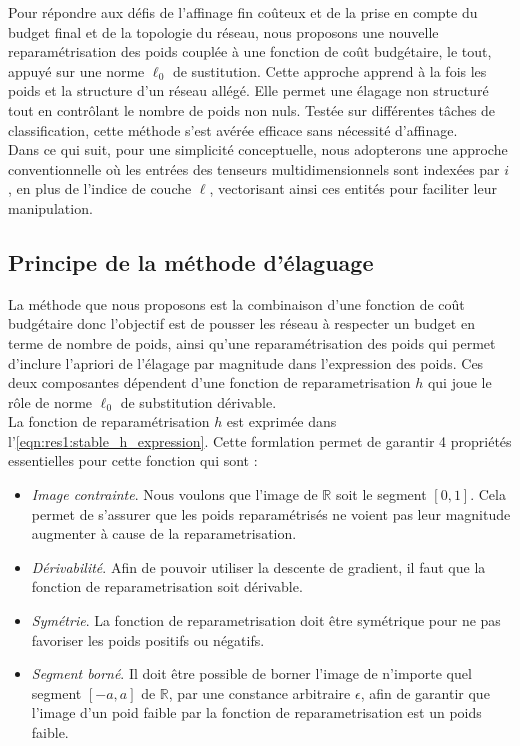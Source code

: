 Pour répondre aux défis de l'affinage fin coûteux et de la prise en compte du
budget final et de la topologie du réseau, nous proposons une nouvelle
reparamétrisation des poids couplée à une fonction de coût budgétaire, le tout,
appuyé sur une norme $\ell_0$ de sustitution. Cette approche apprend à la fois
les poids et la structure d'un réseau allégé. Elle permet une élagage non
structuré tout en contrôlant le nombre de poids non nuls. Testée sur différentes
tâches de classification, cette méthode s'est avérée efficace sans nécessité
d'affinage.\\

Dans ce qui suit, pour une simplicité conceptuelle, nous adopterons une approche
conventionnelle où les entrées des tenseurs multidimensionnels sont indexées par
$i$, en plus de l'indice de couche $\ell$, vectorisant ainsi ces entités pour
faciliter leur manipulation.\\

\subsection*{Principe de la méthode d'élaguage}

La méthode que nous proposons est la combinaison d'une fonction de coût
budgétaire donc l'objectif est de pousser les réseau à respecter un budget en
terme de nombre de poids, ainsi qu'une reparamétrisation des poids qui permet
d'inclure l'apriori de l'élagage par magnitude dans l'expression des poids. Ces
deux composantes  dépendent d'une fonction de reparametrisation $h$ qui joue le
rôle de norme $\ell_0$ de substitution dérivable.\\

La fonction de reparamétrisation $h$ est exprimée dans
l'\cref{eqn:res1:stable_h_expression}. Cette formlation permet de garantir 4 propriétés
essentielles pour cette fonction qui sont :

\begin{itemize}
  \item \emph{Image contrainte}. Nous voulons que l'image de $\mathds{R}$ soit
        le segment $[0, 1]$. Cela permet de s'assurer que les poids reparamétrisés ne
        voient pas leur magnitude augmenter à cause de la reparametrisation.
  \item \emph{Dérivabilité}. Afin de pouvoir utiliser la descente de gradient,
        il faut que la fonction de reparametrisation soit dérivable.
  \item \emph{Symétrie}. La fonction de reparametrisation doit être symétrique
        pour ne pas favoriser les poids positifs ou négatifs.
  \item \emph{Segment borné}. Il doit être possible de borner l'image de
        n'importe quel segment $[-a, a]$ de $\mathds{R}$, par une constance arbitraire
        $\epsilon$, afin de garantir que l'image d'un poid faible par la fonction de
        reparametrisation est un poids faible.
\end{itemize}

